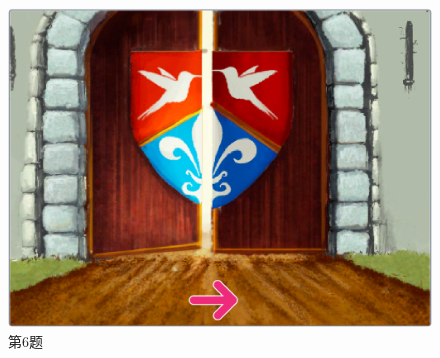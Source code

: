 \documentclass[10pt, a4paper]{article}
\begin{document}
\begin{enumerate}
\begin{figure}[htbp]
\begin{minipage}[t]{.35\textwidth}
\begin{minipage}[t]{.18\textwidth}
                \end{minipage}
                \begin{minipage}[t]{.68\textwidth}
                    \centering
                    \includegraphics[width=\textwidth]{6-2.png}
                \end{minipage}
                \caption*{第6题}
            \end{minipage}
            \begin{minipage}[t]{.35\textwidth}
                \centering
                \begin{minipage}[t]{.18\textwidth}
                    \centering

\end{minipage}
\end{minipage}
\end{figure}
\end{enumerate}
\end{document}
